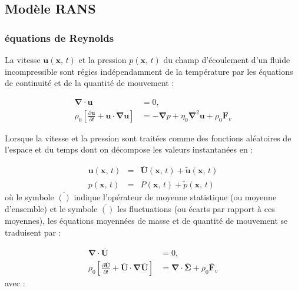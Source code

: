 \subsection{\label{sec:Mod=0000E8le-RANS}Mod\`ele RANS}


\subsubsection{\'equations de Reynolds}

La vitesse $\mathbf{u}(\mathbf{x},\,t)$ et la pression $p(\mathbf{x},\,t)$
du champ d'\'ecoulement d'un fluide incompressible sont r\'egies ind\'ependamment
de la temp\'erature par les \'equations de continuit\'e et de la quantit\'e
de mouvement :

\begin{align}
\boldsymbol{\nabla}\cdot\mathbf{u} & =0,\label{eq:ContinuiteMP-2}\\
\rho_{0}\left[\frac{\partial\mathbf{u}}{\partial t}+\mathbf{u}\cdot\boldsymbol{\nabla}\mathbf{u}\right] & =-\boldsymbol{\nabla}p+\eta_{0}\boldsymbol{\nabla}^{2}\mathbf{u}+\rho_{0}\mathbf{F}_{v}\label{eq:DBF-1-2}
\end{align}


Lorsque la vitesse et la pression sont trait\'ees comme des fonctions
al\'eatoires de l'espace et du temps dont on d\'ecompose les valeurs instantan\'ees
en :

\begin{eqnarray*}
\mathbf{u}(\mathbf{x},\,t) & = & \overline{\mathbf{U}}(\mathbf{x},\,t)+\tilde{\mathbf{u}}(\mathbf{x},\,t)\\
p(\mathbf{x},\,t) & = & \overline{P}(\mathbf{x},\,t)+\tilde{p}(\mathbf{x},\,t)
\end{eqnarray*}
o\`u le symbole $\overline{()}$ indique l'op\'erateur de moyenne statistique
(ou moyenne d'ensemble) et le symbole $\tilde{()}$ les fluctuations
(ou \'ecarts par rapport \`a ces moyennes), les \'equations moyenn\'ees de
masse et de quantit\'e de mouvement se traduisent par \cite[sec 4 p 73--76]{Book_Chassaing}
:

\begin{align}
\boldsymbol{\nabla}\cdot\overline{\mathbf{U}} & =0,\label{eq:ContinuiteMasse_Moyennee}\\
\rho_{0}\left[\frac{\partial\overline{\mathbf{U}}}{\partial t}+\overline{\mathbf{U}}\cdot\boldsymbol{\nabla}\overline{\mathbf{U}}\right] & =\boldsymbol{\nabla}\cdot\overline{\boldsymbol{\Sigma}}+\rho_{0}\overline{\mathbf{F}}_{v}\label{eq:QDM_Moyennee}
\end{align}
avec :

